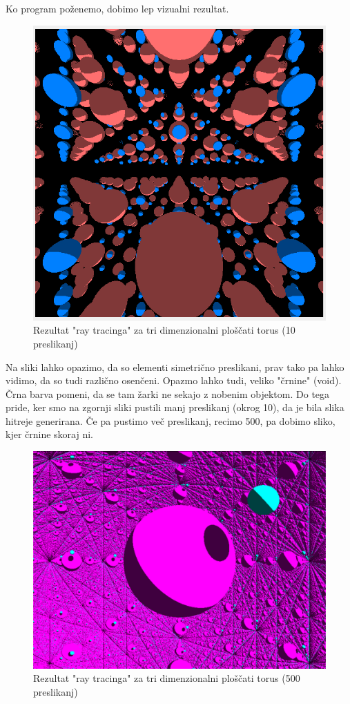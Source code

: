 \documentclass[titlepage]{article}
\begin{document}
Ko program poženemo, dobimo lep vizualni rezultat.
\begin{figure}[H]
    \centering
    \includegraphics[width=0.5\linewidth]{Images/flat_torus.png}
    \caption{Rezultat "ray tracinga" za tri dimenzionalni ploščati torus (10 preslikanj)}
    \label{Slika:Rezultat "ray tracinga" za tri dimenzionalni ploščati torus 1}
\end{figure}
Na sliki lahko opazimo, da so elementi simetrično preslikani, prav tako pa lahko vidimo, da so tudi različno osenčeni. Opazmo lahko tudi, veliko "črnine" (void). Črna barva pomeni, da se tam žarki ne sekajo z nobenim objektom. Do tega pride, ker smo na zgornji sliki pustili manj preslikanj (okrog 10), da je bila slika hitreje generirana. Če pa pustimo več preslikanj, recimo 500, pa dobimo sliko, kjer črnine skoraj ni.

\begin{figure}[H]
    \centering
    \includegraphics[width=0.5\linewidth]{Images/flat_torus_more.png}
    \caption{Rezultat "ray tracinga" za tri dimenzionalni ploščati torus (500 preslikanj)}
    \label{Slika:Rezultat "ray tracinga" za tri dimenzionalni ploščati torus 2}
\end{figure}
\end{document}
